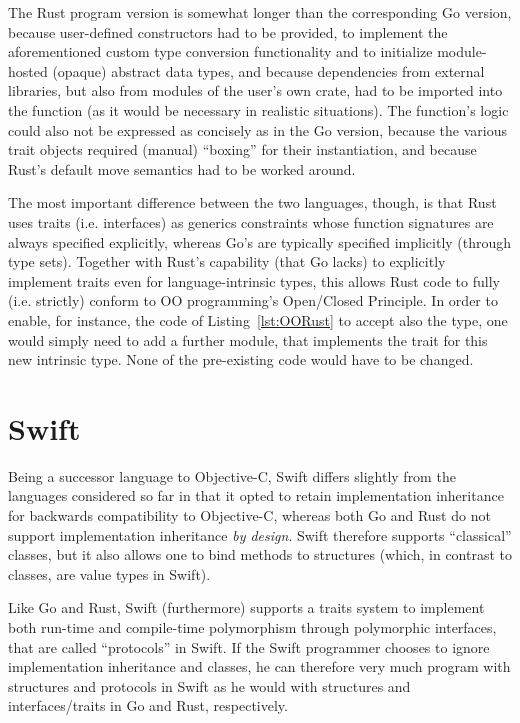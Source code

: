 \documentclass[11pt,oneside]{report}
\newcommand{\code}[1]{{\selectfont\ttfamily{#1}}}
\begin{document}


The Rust program version is somewhat longer than the corresponding Go
version, because user-defined constructors had to be provided, to
implement the aforementioned custom type conversion functionality and
to initialize module-hosted (opaque) abstract data types, and because
dependencies from external libraries, but also from modules of the user's
own crate, had to be imported into the \code{main} function (as it would
be necessary in realistic situations). The \code{main} function's
logic could also not be expressed as concisely as in the Go version,
because the various trait objects required (manual) ``boxing'' for their
instantiation, and because Rust's default move semantics had to be
worked around.

The most important difference between the two languages, though, is
that Rust uses traits (i.e. interfaces) as generics constraints whose
function signatures are always specified explicitly, whereas Go's are
typically specified implicitly (through type sets). Together with
Rust's capability (that Go lacks) to explicitly implement traits even
for language-intrinsic types, this allows Rust code to fully
(i.e. strictly) conform to OO programming's Open/Closed Principle. In
order to enable, for instance, the code of Listing~\ref{lst:OORust} to
accept also the \code{f32} type, one would simply need to add a
further module, that implements the \code{INumeric} trait for this new
intrinsic type. None of the pre-existing code would have to be
changed.

\section{Swift}
\label{sect:Swift}

Being a successor language to Objective-C, Swift differs slightly from
the languages considered so far in that it opted to retain
implementation inheritance for backwards compatibility to Objective-C,
whereas both Go and Rust do not support implementation inheritance
\emph{by design}. Swift therefore supports ``classical'' classes, but
it also allows one to bind methods to structures (which, in contrast
to classes, are value types in Swift).

Like Go and Rust, Swift (furthermore) supports a traits system
to implement both run-time and compile-time polymorphism through
polymorphic interfaces, that are called ``protocols'' in Swift. If the
Swift programmer chooses to ignore implementation inheritance and
classes, he can therefore very much program with structures and
protocols in Swift as he would with structures and interfaces/traits
in Go and Rust, respectively.
\end{document}
